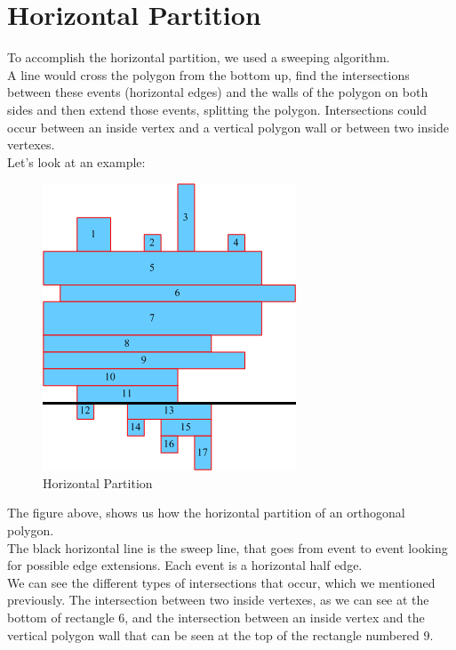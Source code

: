 \documentclass[12pt,a4paper,oneside]{article}
\begin{document}
\pagebreak

\section{Horizontal Partition}
To accomplish the horizontal partition, we used a sweeping algorithm.\\ 
A line would cross the polygon from the bottom up, find the intersections between these events (horizontal edges) and the walls of the polygon on both sides and then extend those events, splitting the polygon.
Intersections could occur between an inside vertex and a vertical polygon wall or between two inside vertexes.\\
Let's look at an example:

\begin{figure}[h!]
  \centering \includegraphics[scale=0.5]{horPartition.png}
  \caption{Horizontal Partition}
  \label{fig:Horizontal Partition}
\end{figure}


The figure above, shows us how the horizontal partition of an orthogonal polygon. \\
The black horizontal line is the sweep line, that goes from event to event looking for possible edge extensions. Each event is a horizontal half edge. \\
We can see the different types of intersections that occur, which we mentioned previously. The intersection between two inside vertexes, as we can see at the bottom of rectangle 6, and the intersection between an inside vertex and the vertical polygon wall that can be seen at the top of the rectangle numbered 9.
\end{document}
